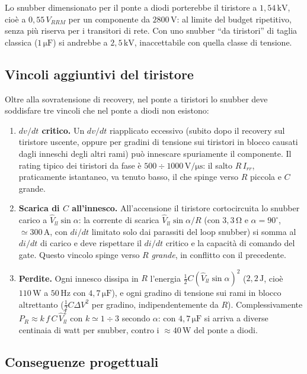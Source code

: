 \documentclass[11pt,a4paper]{article}
\newcommand{\unit}[1]{\,\mathrm{#1}}
\begin{document}
Lo snubber dimensionato per il ponte a diodi porterebbe il tiristore a
$1{,}54\unit{kV}$, cio\`e a $0{,}55\,V_{RRM}$ per un componente da
$2800\unit{V}$: al limite del budget ripetitivo, senza pi\`u riserva per
i transitori di rete. Con uno snubber ``da tiristori'' di taglia
classica ($1\unit{\mu F}$) si andrebbe a $2{,}5\unit{kV}$, inaccettabile
con quella classe di tensione.

\subsection{Vincoli aggiuntivi del tiristore}

Oltre alla sovratensione di recovery, nel ponte a tiristori lo snubber
deve soddisfare tre vincoli che nel ponte a diodi non esistono:
\begin{enumerate}
\item \textbf{$dv/dt$ critico.} Un $dv/dt$ riapplicato eccessivo
(subito dopo il recovery sul tiristore uscente, oppure per gradini di
tensione sui tiristori in blocco causati dagli inneschi degli altri
rami) pu\`o innescare spuriamente il componente. Il rating tipico dei
tiristori da fase \`e $500\div1000\unit{V/\mu s}$: il salto $R\,I_{rr}$,
praticamente istantaneo, va tenuto basso, il che spinge verso $R$
piccola e $C$ grande.
\item \textbf{Scarica di $C$ all'innesco.} All'accensione il tiristore
cortocircuita lo snubber carico a $\hat{V}_{ll}\sin\alpha$: la corrente
di scarica $\hat{V}_{ll}\sin\alpha/R$ (con $3{,}3\unit{\Omega}$ e
$\alpha=90^\circ$, $\simeq 300\unit{A}$, con $di/dt$ limitato solo dai
parassiti del loop snubber) si somma al $di/dt$ di carico e deve
rispettare il $di/dt$ critico e la capacit\`a di comando del gate. Questo
vincolo spinge verso $R$ \emph{grande}, in conflitto con il precedente.
\item \textbf{Perdite.} Ogni innesco dissipa in $R$ l'energia
$\tfrac12 C(\hat{V}_{ll}\sin\alpha)^2$ ($2{,}2\unit{J}$, cio\`e
$110\unit{W}$ a $50\unit{Hz}$ con $4{,}7\unit{\mu F}$), e ogni gradino
di tensione sui rami in blocco altrettanto ($\tfrac12 C\Delta V^2$ per
gradino, indipendentemente da $R$). Complessivamente
$P_R \approx k\,f\,C\,\hat{V}_{ll}^2$ con $k\simeq1\div3$ secondo
$\alpha$: con $4{,}7\unit{\mu F}$ si arriva a diverse centinaia di watt
per snubber, contro i $\approx40\unit{W}$ del ponte a diodi.
\end{enumerate}

\subsection{Conseguenze progettuali}
\end{document}

